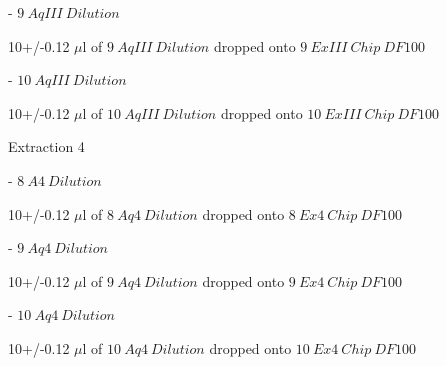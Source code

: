 \documentclass[idxtotoc,hyperref,openany,oneside]{labbook} %
\newcommand{\cmark}{\ding{51}}%
\newcommand{\done}{\rlap{$\square$}{\raisebox{2pt}{\large\hspace{1pt}\cmark}}%
  \hspace{-2.5pt}}
\begin{document}
\begin{todolist}
  \begin{todolist}
  \item[\done]{- $\boxed{9\ AqIII\ Dilution}$}
  \end{todolist}
  \vspace{0.3cm}
  \begin{center}
    10+/-0.12 $\mu$l of $\boxed{9\ AqIII\ Dilution}$ dropped onto
    $\boxed{9\ ExIII\ Chip\ DF100}$
  \end{center}

  \begin{todolist}
  \item[\done]{- $\boxed{10\ AqIII\ Dilution}$}
  \end{todolist}
  \vspace{0.3cm}
  \begin{center}
    10+/-0.12 $\mu$l of $\boxed{10\ AqIII\ Dilution}$ dropped onto
    $\boxed{10\ ExIII\ Chip\ DF100}$
  \end{center}

\item[\done]{Extraction 4}

  \begin{todolist}
  \item[\done]{- $\boxed{8\ A4\ Dilution}$}
  \end{todolist}
  \vspace{0.3cm}
  \begin{center}
    10+/-0.12 $\mu$l of $\boxed{8\ Aq4\ Dilution}$ dropped onto
    $\boxed{8\ Ex4\ Chip\ DF100}$
  \end{center}
  
  \begin{todolist}
  \item[\done]{- $\boxed{9\ Aq4\ Dilution}$}
  \end{todolist}
  \vspace{0.3cm}
  \begin{center}
    10+/-0.12 $\mu$l of $\boxed{9\ Aq4\ Dilution}$ dropped onto
    $\boxed{9\ Ex4\ Chip\ DF100}$
  \end{center}

  \begin{todolist}
  \item[\done]{- $\boxed{10\ Aq4\ Dilution}$}
  \end{todolist}
  \vspace{0.3cm}
  \begin{center}
    10+/-0.12 $\mu$l of $\boxed{10\ Aq4\ Dilution}$ dropped onto
    $\boxed{10\ Ex4\ Chip\ DF100}$
  \end{center}


\end{todolist}
\end{document}
